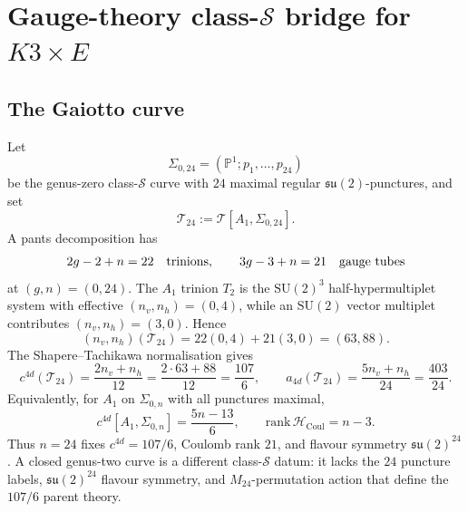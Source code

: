 
\providecommand{\cfd}{c^{4d}}
\providecommand{\ctd}{c^{2d}}
\providecommand{\kBKM}{\kappa_{\mathrm{BKM}}}
\providecommand{\kch}{\kappa_{\mathrm{ch}}}
\providecommand{\kcat}{\kappa_{\mathrm{cat}}}
\providecommand{\kfib}{\kappa_{\mathrm{fiber}}}
\providecommand{\Ntwo}{\mathcal{N}{=}2}
\providecommand{\Nfour}{\mathcal{N}{=}4}
\providecommand{\R}{\mathbb{R}}
\providecommand{\C}{\mathbb{C}}
\providecommand{\Z}{\mathbb{Z}}
\providecommand{\PP}{\mathbb{P}}
\providecommand{\cS}{\mathcal{S}}
\providecommand{\cT}{\mathcal{T}}
\providecommand{\cI}{\mathcal{I}}
\providecommand{\cH}{\mathcal{H}}
\providecommand{\g}{\mathfrak{g}}
\providecommand{\su}{\mathfrak{su}}
\providecommand{\Schur}{\mathrm{Schur}}
\providecommand{\Borch}{\mathrm{Borch}}
\providecommand{\Mtf}{M_{24}}

\section*{Gauge-theory class-\texorpdfstring{$\cS$}{S} bridge for
\texorpdfstring{$K3 \times E$}{K3xE}}

\subsection*{The Gaiotto curve}

Let
\[
  \Sigma_{0,24}=(\PP^1; p_1,\ldots,p_{24})
\]
be the genus-zero class-\(\cS\) curve with \(24\) maximal regular
\(\su(2)\)-punctures, and set
\[
  \cT_{24}:=\cT[A_1,\Sigma_{0,24}].
\]
A pants decomposition has
\[
  2g-2+n = 22
  \quad\hbox{trinions},\qquad
  3g-3+n = 21
  \quad\hbox{gauge tubes}
\]
at \((g,n)=(0,24)\).  The \(A_1\) trinion \(T_2\) is the
\(\mathrm{SU}(2)^3\) half-hypermultiplet system with effective
\((n_v,n_h)=(0,4)\), while an \(\mathrm{SU}(2)\) vector multiplet
contributes \((n_v,n_h)=(3,0)\).  Hence
\[
  (n_v,n_h)(\cT_{24})
  =
  22(0,4)+21(3,0)
  =
  (63,88).
\]
The Shapere--Tachikawa normalisation gives
\[
  \cfd(\cT_{24})
  =
  \frac{2n_v+n_h}{12}
  =
  \frac{2\cdot 63+88}{12}
  =
  \frac{107}{6},
  \qquad
  a_{4d}(\cT_{24})
  =
  \frac{5n_v+n_h}{24}
  =
  \frac{403}{24}.
\]
Equivalently, for \(A_1\) on \(\Sigma_{0,n}\) with all punctures maximal,
\[
  \cfd[A_1,\Sigma_{0,n}]
  =
  \frac{5n-13}{6},
  \qquad
  \mathrm{rank}\,\cH_{\mathrm{Coul}}=n-3.
\]
Thus \(n=24\) fixes \(\cfd=107/6\), Coulomb rank \(21\), and flavour
symmetry \(\su(2)^{24}\).  A closed genus-two curve is a different
class-\(\cS\) datum: it lacks the \(24\) puncture labels,
\(\su(2)^{24}\) flavour symmetry, and \(M_{24}\)-permutation action
that define the \(107/6\) parent theory.

